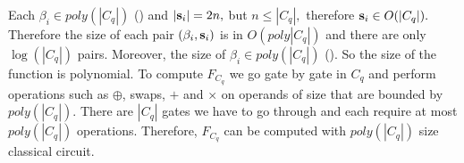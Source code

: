 Each $\beta_i \in poly(|C_q|)$ () and $|{\bf s}_i|=2n,$ but $n\leq |C_q|,$ therefore ${\bf s}_i \in O(|C_q|).$  Therefore the size of each pair $(\beta_i, {\bf s}_i)$ is in $O(poly|C_q|)$ and there are only $\log(|C_q|)$ pairs.
 Moreover,  the size of $\beta_i \in poly(|C_q|)$ (). So the size of the function is polynomial. To compute $F_{C_q}$ we go gate by gate in $C_q$ and perform operations such as $\oplus$, swaps, $+$ and $\times$ on operands of size that are bounded by $poly(|C_q|)$.  There are $|C_q|$ gates we have to go through and each require at most $poly(|C_q|)$
operations. Therefore, $F_{C_q}$ can be computed with $poly(|C_q|)$ size classical circuit.












